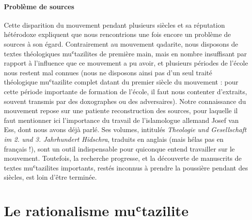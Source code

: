 \paragraph{Problème de sources }Cette disparition du mouvement pendant plusieurs siècles et sa
réputation hétérodoxe expliquent que nous rencontrions une fois encore
un problème de sources à son égard. Contrairement au mouvement qadarite,
nous disposons de textes théologiques muʿtazilites de première main,
mais en nombre insuffisant par rapport à l'influence que ce mouvement a
pu avoir, et plusieurs périodes de l'école nous restent mal connues
(nous ne disposons ainsi pas d'un seul traité théologique muʿtazilite
complet datant du premier siècle du mouvement : pour cette période
importante de formation de l'école, il faut nous contenter d'extraits,
souvent transmis par des doxographes ou des adversaires). Notre
connaissance du mouvement repose sur une patiente reconstruction des
sources, pour laquelle il faut mentionner ici l'importance du travail de
l'islamologue allemand Josef van Ess, dont nous avons déjà parlé. Ses
volumes, intitulés \emph{Theologie und Gesellschaft im 2. und 3.
Jahrhundert Hidschra}, traduits en anglais (mais hélas pas en français
!), sont un outil indispensable pour quiconque entend travailler sur le
mouvement. Toutefois, la recherche progresse, et la découverte de
manuscrits de textes muʿtazilites importants, restés inconnus à prendre
la poussière pendant des siècles, est loin d'être terminée.

\hypertarget{le-rationalisme-muux2bftazilite}{%
\section{Le rationalisme
muʿtazilite}\label{le-rationalisme-muux2bftazilite}}

